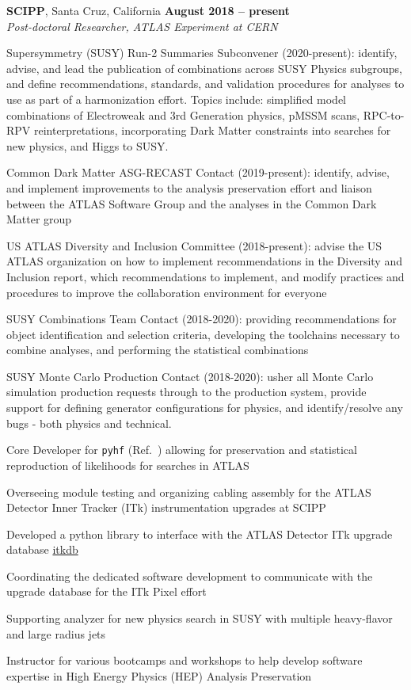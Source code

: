 \documentclass[margin,line]{resume}
\begin{document}
\begin{resume}
\textbf{SCIPP}, Santa Cruz, California \hfill \textbf{August 2018 -- present}\\
\textsl{Post-doctoral Researcher, ATLAS Experiment at CERN}
\begin{list2}
  \item Supersymmetry (SUSY) Run-2 Summaries Subconvener (2020-present): identify, advise, and lead the publication of combinations across SUSY Physics subgroups, and define recommendations, standards, and validation procedures for analyses to use as part of a harmonization effort. Topics include: simplified model combinations of Electroweak and 3rd Generation physics, pMSSM scans, RPC-to-RPV reinterpretations, incorporating Dark Matter constraints into searches for new physics, and Higgs to SUSY.
  \item Common Dark Matter ASG-RECAST Contact (2019-present): identify, advise, and implement improvements to the analysis preservation effort and liaison between the ATLAS Software Group and the analyses in the Common Dark Matter group
  \item US ATLAS Diversity and Inclusion Committee (2018-present): advise the US ATLAS organization on how to implement recommendations in the Diversity and Inclusion report, which recommendations to implement, and modify practices and procedures to improve the collaboration environment for everyone
  \item SUSY Combinations Team Contact (2018-2020): providing recommendations for object identification and selection criteria, developing the toolchains necessary to combine analyses, and performing the statistical combinations
  \item SUSY Monte Carlo Production Contact (2018-2020): usher all Monte Carlo simulation production requests through to the production system, provide support for defining generator configurations for physics, and identify/resolve any bugs - both physics and technical.
  \item Core Developer for \texttt{pyhf} (Ref.~\cite{ATL-PHYS-PUB-2019-029}) allowing for preservation and statistical reproduction of likelihoods for searches in ATLAS
  \item Overseeing module testing and organizing cabling assembly for the ATLAS Detector Inner Tracker (ITk) instrumentation upgrades at SCIPP
  \item Developed a python library to interface with the ATLAS Detector ITk upgrade database \href{https://pypi.org/project/itkdb/}{itkdb}
  \item Coordinating the dedicated software development to communicate with the upgrade database for the ITk Pixel effort
  \item Supporting analyzer for new physics search in SUSY with multiple heavy-flavor and large radius jets \cite{SUSY-2016-10, SUSY-2015-10, ATLAS-CONF-2017-021, ATLAS-CONF-2016-052, ATLAS-CONF-2015-067}
  \item Instructor for various bootcamps and workshops to help develop software expertise in High Energy Physics (HEP) Analysis Preservation~\cite{AwesomeFeb2020,USATLASBootcamp2019}
\end{list2}


\end{resume}
\end{document}
